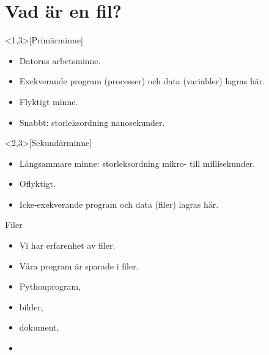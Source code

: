 \mode*

\section{Vad är en fil?}

\begin{frame}
  \begin{definition}<1,3>[Primärminne]
    \begin{itemize}
      \item Datorns arbetsminne.
      \item Exekverande program (processer) och data (variabler) lagras här.
      \item Flyktigt minne.
      \item Snabbt: storleksordning nanosekunder.
    \end{itemize}
  \end{definition}

  \begin{definition}<2,3>[Sekundärminne]
    \begin{itemize}
      \item Långsammare minne: storleksordning mikro- till millisekunder.
      \item Oflyktigt.
      \item Icke-exekverande program och data (filer) lagras här.
    \end{itemize}
  \end{definition}
\end{frame}

\begin{frame}
  \begin{block}{Filer}
    \begin{itemize}
      \item Vi har erfarenhet av filer.
      \item Våra program är sparade i filer.
    \end{itemize}
  \end{block}

  \pause

  \begin{example}
    \begin{itemize}
      \item Pythonprogram,
      \item bilder,
      \item dokument,
      \item \etc
    \end{itemize}
  \end{example}
\end{frame}

